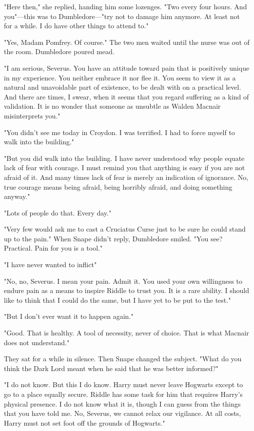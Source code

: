 "Here then," she replied, handing him some lozenges. "Two every four hours. And you{\el}"—this was to Dumbledore—"try not to damage him anymore. At least not for a while. I do have other things to attend to."

"Yes, Madam Pomfrey. Of course." The two men waited until the nurse was out of the room. Dumbledore poured mead.

"I am serious, Severus. You have an attitude toward pain that is positively unique in my experience. You neither embrace it nor flee it. You seem to view it as a natural and unavoidable part of existence, to be dealt with on a practical level. And there are times, I swear, when it seems that you regard suffering as a kind of validation. It is no wonder that someone as unsubtle as Walden Macnair misinterprets you."

"You didn't see me today in Croydon. I was terrified. I had to force myself to walk into the building."

"But you did walk into the building. I have never understood why people equate lack of fear with courage. I must remind you that anything is easy if you are not afraid of it. And many times lack of fear is merely an indication of ignorance. No, true courage means being afraid, being horribly afraid, and doing something anyway."

"Lots of people do that. Every day."

"Very few would ask me to cast a Cruciatus Curse just to be sure he could stand up to the pain." When Snape didn't reply, Dumbledore smiled. "You see? Practical. Pain for you is a tool."

"I have never wanted to inflict{\el}"

"No, no, Severus. I mean your pain. Admit it. You used your own willingness to endure pain as a means to inspire Riddle to trust you. It is a rare ability. I should like to think that I could do the same, but I have yet to be put to the test."

"But I don't ever want it to happen again."

"Good. That is healthy. A tool of necessity, never of choice. That is what Macnair does not understand."

They sat for a while in silence. Then Snape changed the subject. "What do you think the Dark Lord meant when he said that he was better informed?"

"I do not know. But this I do know. Harry must never leave Hogwarts except to go to a place equally secure. Riddle has some task for him that requires Harry's physical presence. I do not know what it is, though I can guess from the things that you have told me. No, Severus, we cannot relax our vigilance. At all costs, Harry must not set foot off the grounds of Hogwarts."

